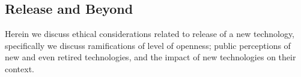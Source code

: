 \iffalse
\subsubsection{Privacy and Security concerns}

Privacy issues: \cite{pan_privacy_2020, lukas_analyzing_2023}
Leaking PII \cite{huang_are_2022}

\subsubsection{Misinformation, Plagiarism, and Watermarking (Authenticity?)}
watermarking for LLM \cite{kirchenbauer_watermark_2023, grinbaum_ethical_2022}
plagiarism in LLM \cite{lee_language_2022}
Misinfo: \cite{pan_risk_2023}
\subsubsection{Discrimination}

\fi 


\subsection{Release and Beyond}
Herein we discuss ethical considerations related to release of a new technology, specifically we discuss ramifications of level of openness; public perceptions of new and even retired technologies, and the impact of new technologies on their context.

